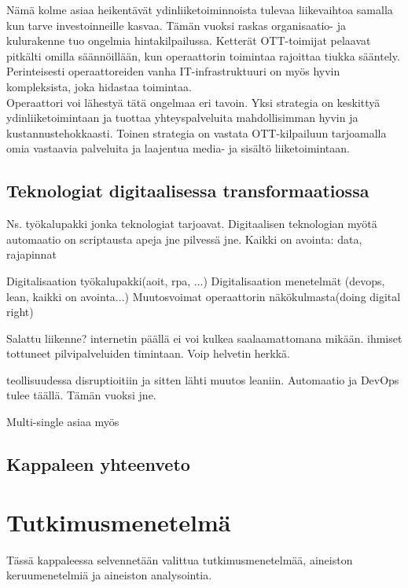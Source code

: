 \documentclass[finnish,12pt,a4paper,pdftex]{article}
\begin{document}
Nämä kolme asiaa heikentävät ydinliiketoiminnoista tulevaa liikevaihtoa samalla kun tarve investoinneille kasvaa. Tämän vuoksi raskas organisaatio- ja kulurakenne tuo ongelmia hintakilpailussa. Ketterät OTT-toimijat pelaavat pitkälti omilla säännöillään, kun operaattorin toimintaa rajoittaa tiukka sääntely. Perinteisesti operaattoreiden vanha IT-infrastruktuuri on myös hyvin kompleksista, joka hidastaa toimintaa. \citep{inderes}\\

Operaattori voi lähestyä tätä ongelmaa eri tavoin. Yksi strategia on keskittyä ydinliiketoimintaan ja tuottaa yhteyspalveluita mahdollisimman hyvin ja kustannustehokkaasti. Toinen strategia on vastata OTT-kilpailuun tarjoamalla omia vastaavia palveluita ja laajentua media- ja sisältö liiketoimintaan. \citep{inderes}


\subsection{Teknologiat digitaalisessa transformaatiossa}
Ns. työkalupakki jonka teknologiat tarjoavat.
Digitaalisen teknologian myötä automaatio on scriptausta apeja jne pilvessä jne. Kaikki on avointa: data, rajapinnat

Digitalisaation työkalupakki(aoit, rpa, ...)
Digitalisaation menetelmät (devops, lean, kaikki on avointa...)
Muutosvoimat operaattorin näkökulmasta(doing digital right)


Salattu liikenne? internetin päällä ei voi kulkea saalaamattomana mikään.
ihmiset tottuneet pilvipalveluiden timintaan. Voip helvetin herkkä.


teollisuudessa disruptioitiin ja sitten lähti muutos leaniin.
Automaatio ja DevOps tulee täällä. Tämän vuoksi jne.

Multi-single asiaa myös


\subsection{Kappaleen yhteenveto}

\clearpage

\section{Tutkimusmenetelmä}

Tässä kappaleessa selvennetään valittua tutkimusmenetelmää, aineiston keruumenetelmiä ja aineiston analysointia. 
\end{document}
